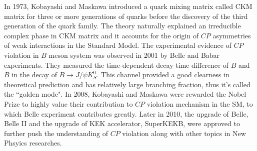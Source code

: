 In 1973, Kobayashi and Maskawa introduced a quark mixing matrix called CKM matrix for three or more generations of quarks before the discovery of the third generation of the quark family\cite{CKM}. The theory naturally explained an irreducible complex phase in CKM matrix and it accounts for the origin of $CP$ asymmetries of weak interactions in the Standard Model. The experimental evidence of $CP$ violation in $B$ meson system was observed in 2001 by Belle and Babar experiments\cite{teramoto2002cp}\cite{langestudy}. They measured the time-dependent decay time difference of $B$ and $\bar{B}$ in the decay of $B\to J/\psi K_S^0$. This channel provided a good clearness in theoretical prediction and has relatively large branching fraction, thus it's called the ``golden mode"\cite{bigi1989question}. In 2008, Kobayashi and Maskawa were rewarded the Nobel Prize to highly value their contribution to $CP$ violation mechanism in the SM, to which Belle experiment contributes greatly. Later in 2010, the upgrade of Belle, Belle II and the upgrade of KEK accelerator, SuperKEKB, were approved to further push the understanding of $CP$ violation along with other topics in New Phsyics researches. 

